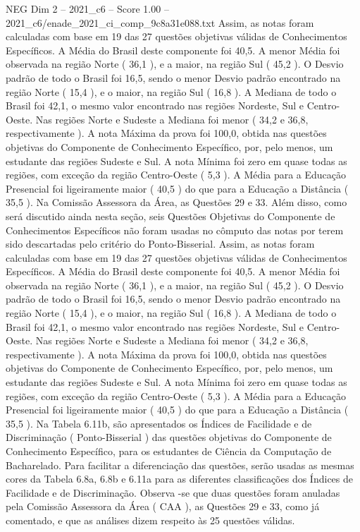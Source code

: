 \begin{textsample}{NEG Dim 2 – 2021\_c6 – Score 1.00 – 2021\_c6/enade\_2021\_ci\_comp\_9c8a31e088.txt}
Assim, as notas foram calculadas com base em 19 das 27 questões objetivas válidas de Conhecimentos Específicos.
A Média do Brasil deste componente foi 40,5.
A menor Média foi observada na região Norte ( 36,1 ), e a maior, na região Sul ( 45,2 ).
O Desvio padrão de todo o Brasil foi 16,5, sendo o menor Desvio padrão encontrado na região Norte ( 15,4 ), e o maior, na região Sul ( 16,8 ).
A Mediana de todo o Brasil foi 42,1, o mesmo valor encontrado nas regiões Nordeste, Sul e Centro-Oeste.
Nas regiões Norte e Sudeste a Mediana foi menor ( 34,2 e 36,8, respectivamente ).
A nota Máxima da prova foi 100,0, obtida nas questões objetivas do Componente de Conhecimento Específico, por, pelo menos, um estudante das regiões Sudeste e Sul.
A nota Mínima foi zero em quase todas as regiões, com exceção da região Centro-Oeste ( 5,3 ).
A Média para a Educação Presencial foi ligeiramente maior ( 40,5 ) do que para a Educação a Distância ( 35,5 ).
Na Comissão Assessora da Área, as Questões 29 e 33.
Além disso, como será discutido ainda nesta seção, seis Questões Objetivas do Componente de Conhecimentos Específicos não foram usadas no cômputo das notas por terem sido descartadas pelo critério do Ponto-Bisserial.
Assim, as notas foram calculadas com base em 19 das 27 questões objetivas válidas de Conhecimentos Específicos.
A Média do Brasil deste componente foi 40,5.
A menor Média foi observada na região Norte ( 36,1 ), e a maior, na região Sul ( 45,2 ).
O Desvio padrão de todo o Brasil foi 16,5, sendo o menor Desvio padrão encontrado na região Norte ( 15,4 ), e o maior, na região Sul ( 16,8 ).
A Mediana de todo o Brasil foi 42,1, o mesmo valor encontrado nas regiões Nordeste, Sul e Centro-Oeste.
Nas regiões Norte e Sudeste a Mediana foi menor ( 34,2 e 36,8, respectivamente ).
A nota Máxima da prova foi 100,0, obtida nas questões objetivas do Componente de Conhecimento Específico, por, pelo menos, um estudante das regiões Sudeste e Sul.
A nota Mínima foi zero em quase todas as regiões, com exceção da região Centro-Oeste ( 5,3 ).
A Média para a Educação Presencial foi ligeiramente maior ( 40,5 ) do que para a Educação a Distância ( 35,5 ).
Na Tabela 6.11b, são apresentados os Índices de Facilidade e de Discriminação ( Ponto-Bisserial ) das questões objetivas do Componente de Conhecimento Específico, para os estudantes de Ciência da Computação de Bacharelado.
Para facilitar a diferenciação das questões, serão usadas as mesmas cores da Tabela 6.8a, 6.8b e 6.11a para as diferentes classificações dos Índices de Facilidade e de Discriminação.
Observa -se que duas questões foram anuladas pela Comissão Assessora da Área ( CAA ), as Questões 29 e 33, como já comentado, e que as análises dizem respeito às 25 questões válidas.

\end{textsample}
